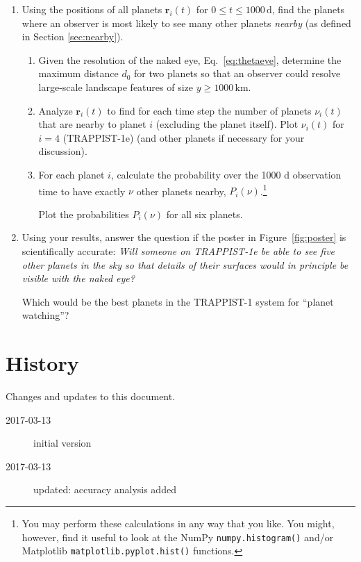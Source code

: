 \documentclass[letterpaper]{scrartcl}
\newenvironment{enuma}{\begin{enumerate}[label=(\alph*)]}{\end{enumerate}}
\newenvironment{enumi}{\begin{enumerate}[label=(\roman*)]}{\end{enumerate}}
\renewcommand{\vec}[1]{\ensuremath{\mathbf{#1}}}
\begin{document}
\begin{enuma}
\begin{enumi}
    the planets). Assume an observer looks side on the system along
    the $y$-direction. Compute a time series of the $y$-component of
    the velocity of the star. Compare the changes to the resolution
    of current Doppler spectrometers (about 1 m/s). Would the wobble
    be detectable?
  \end{enumi}
\item Using the positions of all planets $\vec{r}_{i}(t)$ for $0 \leq
  t \leq 1000\,\text{d}$, find the planets where an observer is most
  likely to see many other planets \emph{nearby} (as defined in Section
  \ref{sec:nearby}).
  \begin{enumi}    
  \item Given the resolution of the naked eye, Eq.~\ref{eq:thetaeye},
    determine the maximum distance $d_{0}$ for two planets so that an
    observer could resolve large-scale landscape features of size $y
    \ge 1000\,\text{km}$.
  \item Analyze $\vec{r}_{i}(t)$ to find for each time step the number
    of planets $\nu_{i}(t)$ that are nearby to planet $i$ (excluding
    the planet itself). Plot $\nu_{i}(t)$ for $i=4$ (TRAPPIST-1e) (and
    other planets if necessary for your discussion).
  \item For each planet $i$, calculate the probability over the 1000 d
    observation time to have exactly $\nu$ other planets nearby,
    $P_{i}(\nu)$.\footnote{You may perform these calculations in any
      way that you like. You might, however, find it useful to look at
      the NumPy \texttt{numpy.histogram()} and/or Matplotlib
      \texttt{matplotlib.pyplot.hist()} functions.} 
    
    Plot the probabilities $P_{i}(\nu)$ for all six planets. 
  \end{enumi}
\item Using your results, answer the question if the poster in
  Figure~\ref{fig:poster} is scientifically accurate: \emph{Will
    someone on TRAPPIST-1e be able to see five other planets in the
    sky so that details of their surfaces would in principle be
    visible with the naked eye?}

  Which would be the best planets in the TRAPPIST-1 system for
  ``planet watching''?
\end{enuma}

\section{History}
\label{sec:history}

Changes and updates to this document.
\begin{description}
\item[2017-03-13] initial version
\item[2017-03-13] updated: accuracy analysis added
\end{description}

\end{document}

